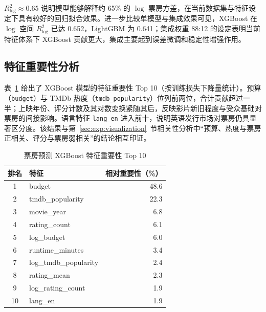 $R^2_{\log} \approx 0.65$ 说明模型能够解释约 65\% 的 $\log$ 票房方差，在当前数据集与特征设定下具有较好的回归拟合效果。进一步比较单模型与集成效果可见，XGBoost 在 $\log$ 空间 $R^2_{\log}$ 已达 0.652，LightGBM 为 0.641；集成权重 88:12 的设定表明当前特征体系下 XGBoost 贡献更大，集成主要起到误差微调和稳定性增强作用。

\subsection{特征重要性分析}

表~\ref{tab:feature-importance} 给出了 XGBoost 模型的特征重要性 Top 10（按训练损失下降量统计）。预算（\texttt{budget}）与 TMDb 热度（\texttt{tmdb\_popularity}）位列前两位，合计贡献超过一半；上映年份、评分计数及其对数变换紧随其后，反映影片新旧程度与受众基础对票房的间接影响。语言特征 \texttt{lang\_en} 进入前十，说明英语发行市场对票房仍具显著区分度。该结果与第~\ref{sec:exp:visualization}~节相关性分析中“预算、热度与票房正相关、评分与票房弱相关”的结论相互印证。

\begin{table}[htbp]
    \centering
    \caption{票房预测 XGBoost 特征重要性 Top 10} \label{tab:feature-importance}
    \renewcommand{\arraystretch}{1.2}
    \setlength{\tabcolsep}{10pt}
    \begin{tabular}{|c|l|r|}
        \hline
        \textbf{排名} & \textbf{特征} & \textbf{相对重要性（\%）} \\
        \hline
        1  & budget              & 48.6 \\
        \hline
        2  & tmdb\_popularity    & 22.3 \\
        \hline
        3  & movie\_year         &  6.8 \\
        \hline
        4  & rating\_count       &  6.1 \\
        \hline
        5  & log\_budget         &  6.0 \\
        \hline
        6  & runtime\_minutes    &  3.4 \\
        \hline
        7  & log\_tmdb\_popularity & 2.4 \\
        \hline
        8  & rating\_mean        &  2.3 \\
        \hline
        9  & log\_rating\_count  &  1.9 \\
        \hline
        10 & lang\_en            &  1.9 \\
        \hline
    \end{tabular}
\end{table}

